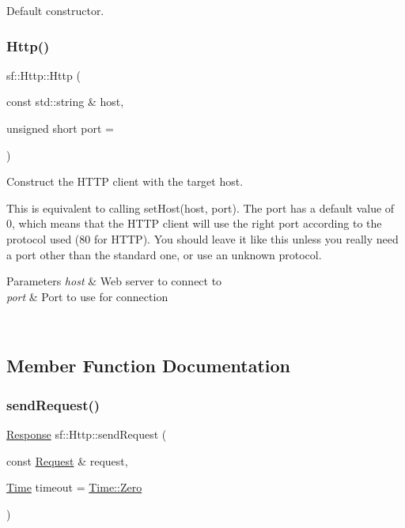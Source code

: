 Default constructor. 

\begin{DoxyVerb}\end{DoxyVerb}
 \mbox{\label{classsf_1_1_http_a79efd844a735f083fcce0edbf1092385}} 
\subsubsection{\texorpdfstring{Http()}{Http()}\hspace{0.1cm}{\footnotesize\ttfamily [2/2]}}
{\footnotesize\ttfamily sf\+::\+Http\+::\+Http (\begin{DoxyParamCaption}\item[{const std\+::string \&}]{host,  }\item[{unsigned short}]{port = {} }\end{DoxyParamCaption})}



Construct the H\+T\+TP client with the target host. 

This is equivalent to calling set\+Host(host, port). The port has a default value of 0, which means that the H\+T\+TP client will use the right port according to the protocol used (80 for H\+T\+TP). You should leave it like this unless you really need a port other than the standard one, or use an unknown protocol.


\begin{DoxyParams}{Parameters}
{\em host} & Web server to connect to \\
\hline
{\em port} & Port to use for connection \begin{DoxyVerb}\end{DoxyVerb}
 \\
\hline
\end{DoxyParams}


\subsection{Member Function Documentation}
\mbox{\label{classsf_1_1_http_aaf09ebfb5e00dcc82e0d494d5c6a9e2a}} 
\subsubsection{\texorpdfstring{sendRequest()}{sendRequest()}}
{\footnotesize\ttfamily \mbox{\hyperlink{classsf_1_1_http_1_1_response}{Response}} sf\+::\+Http\+::send\+Request (\begin{DoxyParamCaption}\item[{const \mbox{\hyperlink{classsf_1_1_http_1_1_request}{Request}} \&}]{request,  }\item[{\mbox{\hyperlink{classsf_1_1_time}{Time}}}]{timeout = {\ttfamily \mbox{\hyperlink{classsf_1_1_time_a8db127b632fa8da21550e7282af11fa0}{Time\+::\+Zero}}} }\end{DoxyParamCaption})}



